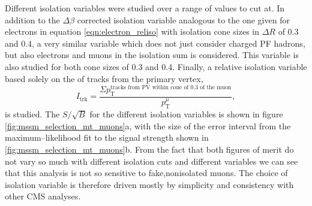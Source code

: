Different isolation variables were studied over a range of values
to cut at. In addition to the $\Delta\beta$ corrected isolation variable analogous
to the one given for electrons in equation \ref{eqn:electron_reliso} with 
isolation cone sizes in $\Delta R$ of 0.3 and 0.4, a very similar
variable which does not just consider charged \ac{PF} hadrons, but
also electrons and muons in the isolation sum is considered. This
variable is also studied for both cone sizes of 0.3 and 0.4. Finally,
a relative isolation variable based solely on the \pT of tracks from the primary
vertex,
\begin{equation}\label{eqn:reltrkiso}
I_{\text{trk}} = \frac{\Sigma p_{\text{T}}^{\text{tracks from PV within cone of 0.3 of the muon}}}{p_{\text{T}}^{\mu}}, \end{equation} 
is studied. The $S/\sqrt{B}$ for the different isolation variables is shown in figure \ref{fig:mssm_selection_mt_muons}a, with the
size of the error interval from the maximum--likelihood fit to the \Ztautau signal strength shown in 
\ref{fig:mssm_selection_mt_muons}b. From the fact that both figures of merit do not
vary so much with different isolation cuts and different variables we can see that this analysis
is not so sensitive to fake,nonisolated muons. The choice of isolation variable is therefore
driven mostly by simplicity and consistency with other \ac{CMS} analyses.


